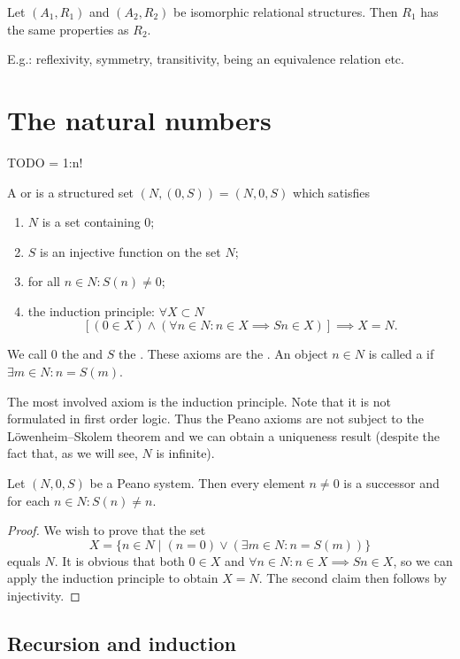 \begin{lemma}
Let $(A_1, R_1)$ and $(A_2, R_2)$ be isomorphic relational structures. Then $R_1$ has the same properties as $R_2$.
\end{lemma}
E.g.: reflexivity, symmetry, transitivity, being an equivalence relation etc.


\chapter{The natural numbers}
TODO = 1:n!
\begin{definition}
A  or  is a structured set $(N,(0,S)) = (N,0,S)$ which satisfies
\begin{enumerate}
\item $N$ is a set containing $0$;
\item $S$ is an injective function on the set $N$;
\item for all $n\in N: S(n) \neq 0$;
\item the induction principle: $\forall X\subset N$
\[ [(0\in X) \land (\forall n\in N: n\in X \implies Sn \in X)] \implies X = N. \]
\end{enumerate}
We call $0$ the  and $S$ the . These axioms are the . An object $n\in N$ is called a  if $\exists m\in N: n = S(m)$.
\end{definition}
The most involved axiom is the induction principle. Note that it is not formulated in first order logic. Thus the Peano axioms are not subject to the Löwenheim–Skolem theorem and we can obtain a uniqueness result (despite the fact that, as we will see, $N$ is infinite).

\begin{lemma} \label{lemma:successor}
Let $(N,0,S)$ be a Peano system. Then every element $n\neq 0$ is a successor and for each $n\in N: S(n) \neq n$.
\end{lemma}
\begin{proof}
We wish to prove that the set
\[ X = \{n\in N\;|\; (n=0)\lor(\exists m\in N: n = S(m))\} \]
equals $N$. It is obvious that both $0\in X$ and $\forall n\in N: n\in X \implies Sn \in X$, so we can apply the induction principle to obtain $X=N$. The second claim then follows by injectivity.
\end{proof}
\section{Recursion and induction}
